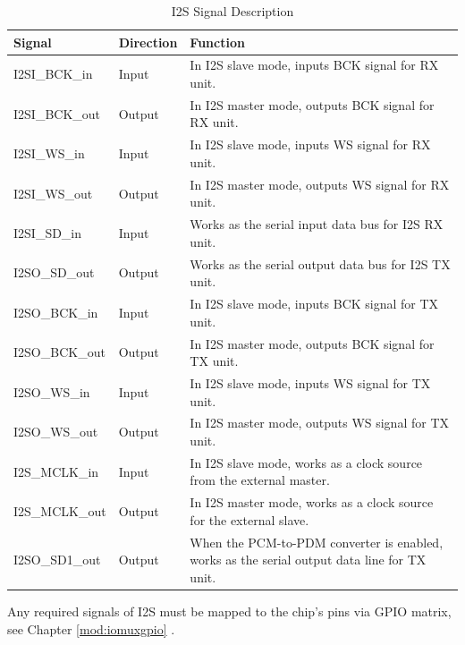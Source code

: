 \documentclass[main\_\_EN.tex]{subfiles}
\begin{document}
\begin{table}[H]
    \centering
    \caption{I2S Signal Description}
    \label{tab:i2s-signal-descr}
    \begin{threeparttable}
    \begin{tabular}{|p{2.5cm}|p{1.8cm}|p{10.5cm}| }
    \hline
    \rowcolor{lightgray}
    \textbf{Signal} & \textbf{Direction} & \textbf{Function} \\
    \hline
    I2SI\_BCK\_in  & Input & In I2S slave mode, inputs BCK signal for RX unit. \\
    \hline
    I2SI\_BCK\_out& Output & In I2S master mode, outputs BCK signal for RX unit. \\
    \hline
    I2SI\_WS\_in & Input & In I2S slave mode, inputs WS signal for RX unit. \\
    \hline
    I2SI\_WS\_out& Output & In I2S master mode, outputs WS signal for RX unit. \\\hline
    I2SI\_SD\_in& Input & Works as the serial input data bus for I2S RX unit.\\\hline
    I2SO\_SD\_out& Output & Works as the serial output data bus for I2S TX unit.\\\hline
    I2SO\_BCK\_in&  Input & In I2S slave mode, inputs BCK signal for TX unit. \\\hline
    I2SO\_BCK\_out&  Output & In I2S master mode, outputs BCK signal for TX unit. \\\hline
    I2SO\_WS\_in&  Input & In I2S slave mode, inputs WS signal for TX unit. \\\hline
    I2SO\_WS\_out& Output & In I2S master mode, outputs WS signal for TX unit. \\\hline
    I2S\_MCLK\_in& Input & In I2S slave mode, works as a clock source from the external master.\\\hline
    I2S\_MCLK\_out& Output & In I2S master mode, works as a clock source for the external slave. \\\hline
    I2SO\_SD1\_out& Output & When the PCM-to-PDM converter is enabled, works as the serial output data line for TX unit. \\\hline
    \end{tabular}
    \begin{tablenotes}
        \item[*] Any required signals of I2S must be mapped to the chip's pins via GPIO matrix, see Chapter \ref{mod:iomuxgpio} \textit{}.
    \end{tablenotes}
    \end{threeparttable}
\end{table}
\end{document}
